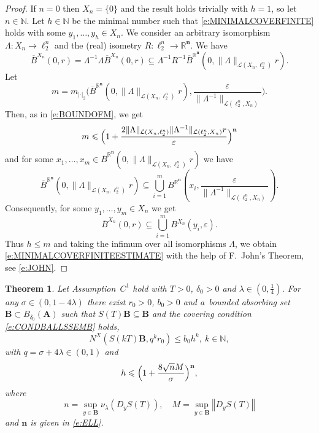 \documentclass[a4paper,12pt,reqno]{amsart}
\theoremstyle{plain}
\newtheorem{thm}[lem]{Theorem}
\theoremstyle{definition}
\numberwithin{equation}{section}
\newcommand{\N}{\mathbb{N}}
\newcommand{\R}{\mathbb{R}}
\newcommand{\norm}[1]{\left\Vert#1\right\Vert}
\newcommand{\eps}{\varepsilon}
\renewcommand{\leq}{\leqslant}
\begin{document}
\begin{proof}
If $n=0$ then $X_n=\{0\}$ and the result holds trivially with $h=1$, so let $n\in\N$. 
Let $h\in\N$ be the minimal number such that \eqref{e:MINIMALCOVERFINITE} holds with some $y_1,\ldots, y_h\in X_n$.
We consider an arbitrary isomorphism $\Lambda\colon X_n\to\ell^{n}_2$ and the (real) isometry $R\colon\ell^{n}_2\to\R^{\mathbf{n}}$. We have
$$\overline{B}^{X_n}(0,r)=\Lambda^{-1}\Lambda \overline{B}^{X_n}(0,r)\subseteq\Lambda^{-1}R^{-1}\overline{B}^{\R^{\mathbf{n}}}(0,\|\Lambda\|_{\mathcal{L}(X_n,\ell^n_2)}r).$$
Let
$$m=m_{|\cdot|_2}\Big(\overline{B}^{\R^{\mathbf{n}}}(0,\|\Lambda\|_{\mathcal{L}(X_n,\ell^n_2)}r),\frac{\eps}{\|\Lambda^{-1}\|_{\mathcal{L}(\ell^n_2,X_n)}}\Big).$$
Then, as in \eqref{e:BOUNDOFM}, we get
$$m\leq\Bigl(1+\frac{2\|\Lambda\|_{\mathcal{L}(X_n,\ell^n_2)}\|\Lambda^{-1}\|_{\mathcal{L}(\ell^n_2,X_n)}r}{\eps}\Bigr)^{\mathbf{n}}$$
and for some $x_1,\ldots,x_m\in \overline{B}^{\R^{\mathbf{n}}}(0,\|\Lambda\|_{\mathcal{L}(X_n,\ell^n_2)}r)$ we have
$$\overline{B}^{\R^{\mathbf{n}}}(0,\|\Lambda\|_{\mathcal{L}(X_n,\ell^n_2)}r)\subseteq\bigcup_{i=1}^{m}B^{\R^{\mathbf{n}}}(x_i,\frac{\eps}{\|\Lambda^{-1}\|_{\mathcal{L}(\ell^n_2,X_n)}}).$$
Consequently, for some $y_1,\ldots,y_m\in X_n$ we get
$$\overline{B}^{X_n}(0,r)\subseteq\bigcup_{i=1}^{m}B^{X_n}(y_i,\eps).$$
Thus $h\leq m$ and taking the infimum over all isomorphisms $\Lambda$, we obtain \eqref{e:MINIMALCOVERFINITEESTIMATE} with the help of F.~John's Theorem, see \eqref{e:JOHN}.   
\end{proof}

\begin{thm}\label{thm:C1SEMIGROUP}
Let Assumption~$C^1$ hold with $T>0$, $\delta_0>0$ and $\lambda\in(0,\frac{1}{4})$.
For any $\sigma\in(0,1-4\lambda)$ there exist $r_0>0$, $b_0>0$ and a~bounded absorbing set $\mathbf{B}\subset B_{\delta_0}(\mathbf{A})$ such that $S(T)\mathbf{B}\subseteq\mathbf{B}$ and the covering condition \eqref{e:CONDBALLSSEMB} holds,
\begin{equation}\label{e:COVERINGC1}
N^{X}(S(kT)\mathbf{B},q^{k}r_0)\leq b_0h^{k},\ k\in\N,
\end{equation}
with $q=\sigma+4\lambda\in(0,1)$ and
\begin{equation}\label{e:ESTIMATEH}
h\leq\Bigl(1+\frac{8\sqrt{n}M}{\sigma}\Bigr)^{\mathbf{n}},
\end{equation}
where
$$n=\sup_{y\in\mathbf{B}}\nu_{\lambda}(D_y S(T)),\quad M=\sup_{y\in\mathbf{B}}\norm{D_y S(T)}$$
and $\mathbf{n}$ is given in \eqref{e:ELL}.
\end{thm}
\end{document}
